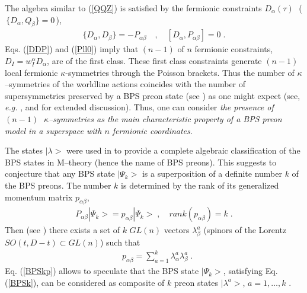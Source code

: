 \documentclass[a4paper,11pt]{article}
\begin{document}
The algebra similar to (\ref{QQZ}) 
is satisfied by the fermionic constraints $D_\alpha (\tau)\; $ 
($\,\{ D_\alpha, Q_\beta\}= 0\,$), 
\begin{eqnarray}\label{DDP} 
    \{ D_\alpha, D_\beta\}= - P_{\alpha\beta}\quad , 
   \quad [D_\alpha, P_{\alpha\beta}]=0
    \; . 
\end{eqnarray} 
Eqs. (\ref{DDP}) and  (\ref{Pll0})
imply that $(n-1)$ of $n$ fermionic constraints, 
$D_I = w^{\alpha}_I D_\alpha$, 
 are of the first class. 
These first class constraints generate $(n-1)$ local fermionic 
$\kappa$-symmetries through the Poisson brackets. Thus the number of 
$\kappa$--symmetries of the worldline actions \cite{BL98} coincides 
with the number of supersymmetries preserved by a BPS preon state
(see \cite{BPS01}) as one might expect 
(see, {\it e.g.} \cite{BKO}, and  \cite{BdAI2} for extended discussion). 
Thus, 
one can consider {\sl  
the presence of $(n-1)$ $\; \kappa$--symmetries as 
the main characteristic property of a BPS preon model 
in a superspace with $n$ fermionic coordinates}. 

 
The states  $|\lambda>$ 
 were used in \cite{BPS01} to provide a complete 
algebraic classification of the BPS states in M--theory 
(hence the name of BPS  preons). 
This suggests to conjecture 
that  any BPS state $|\Psi_k >$ 
is a superposition of a definite  number $k$   
of the BPS preons. 
The number $k$ is determined by the rank of its  
generalized momentum matrix $p_{\alpha\beta}$,  
\begin{eqnarray}\label{BPSk} 
P_{\alpha\beta}|\Psi_k >= 
p_{\alpha\beta}|\Psi_k >\; , \quad 
rank ( p_{\alpha\beta})= k \; .
\end{eqnarray}
Then (see \cite{BPS01}) there exists a set of $k$ $GL(n)$ vectors 
$\lambda^a_{\beta}$ (spinors of the Lorentz $SO(t,D-t)\subset GL(n)$)  
such that  
\begin{eqnarray}\label{BPSkp} 
& p_{\alpha\beta}= 
\sum\limits_{a=1}^{k} \lambda_{\alpha}^a\lambda^a_{\beta} \; . 
\end{eqnarray}
Eq. (\ref{BPSkp}) allows to speculate that the BPS state $|\Psi_k >$, 
satisfying Eq. (\ref{BPSk}),   
can be considered as composite of $k$ preon states 
$|\lambda^a>$, $a=1, \ldots ,
k$ \cite{BPS01}.  
\end{document}
